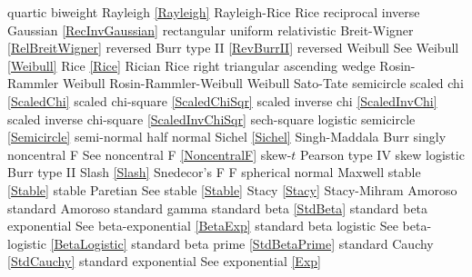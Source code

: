 quartic							\dotfill	biweight							\ncite
%
Rayleigh  						\dotfill	\eqref{Rayleigh}					\ncite	%
Rayleigh-Rice					\dotfill	Rice								\ncite
reciprocal inverse Gaussian		\dotfill	\eqref{RecInvGaussian}				\ncite
rectangular						\dotfill	uniform 							\ncite	%
relativistic Breit-Wigner		\dotfill	\eqref{RelBreitWigner}				\ncite	%
reversed Burr type II			\dotfill	\eqref{RevBurrII} 					\ncite	%
reversed Weibull				\dotfill	See Weibull \eqref{Weibull}			\ncite	%
Rice							\dotfill	\eqref{Rice}						\ncite
Rician							\dotfill	Rice								\ncite
right triangular				\dotfill	ascending wedge 					\ncite	%
Rosin-Rammler 					\dotfill	Weibull								\mcite{Rosin1933}   		%
Rosin-Rammler-Weibull 			\dotfill	Weibull								\ncite	%
%
Sato-Tate						\dotfill	semicircle 							\ncite	%
scaled chi						\dotfill	\eqref{ScaledChi}					\ncite	%
scaled chi-square 				\dotfill	\eqref{ScaledChiSqr}				\ncite	%
scaled inverse chi 				\dotfill	\eqref{ScaledInvChi}				\ncite	%
scaled inverse chi-square 		\dotfill	\eqref{ScaledInvChiSqr}				 	%
sech-square 					\dotfill	logistic							\ncite	%
semicircle						\dotfill	\eqref{Semicircle}					\ncite	%
semi-normal 					\dotfill	half normal 						\ncite	%
Sichel							\dotfill	\eqref{Sichel}						\ncite	
Singh-Maddala 					\dotfill	Burr 								\ncite	%
singly noncentral F       		\dotfill	See noncentral F  \eqref{NoncentralF}	\ncite 
skew-$t$						\dotfill	Pearson type IV 					\ncite	%
skew logistic					\dotfill	Burr type II 						\ncite	%
Slash							\dotfill	\eqref{Slash}						\ncite
Snedecor's F  					\dotfill	F 									\ncite	%
spherical normal				\dotfill	Maxwell								\ncite	%
stable							\dotfill	\eqref{Stable}						\ncite
stable Paretian 				\dotfill	See stable \eqref{Stable}			\ncite
Stacy 							\dotfill	\eqref{Stacy} 						\ncite	%
Stacy-Mihram					\dotfill	Amoroso								\ncite	%
standard Amoroso				\dotfill	standard gamma 						\ncite	%
standard beta					\dotfill	\eqref{StdBeta} 					\ncite	%
standard beta exponential		\dotfill	See beta-exponential \eqref{BetaExp}	\ncite	%
standard beta logistic			\dotfill	See beta-logistic \eqref{BetaLogistic}		\ncite	%
standard beta prime				\dotfill	\eqref{StdBetaPrime}				\ncite	%
standard Cauchy					\dotfill	\eqref{StdCauchy} 					\ncite	%
standard exponential			\dotfill	See exponential \eqref{Exp} 		\ncite	%
